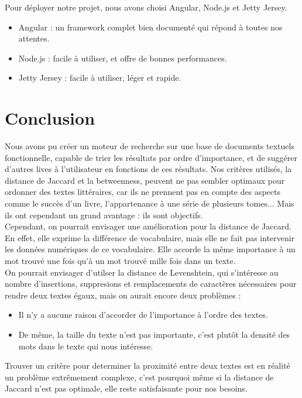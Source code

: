 \documentclass{article}
\begin{document}
Pour déployer notre projet, nous avons choisi Angular, Node.js et Jetty Jersey.\\

\begin{itemize}
\item Angular : un framework complet bien documenté qui répond à toutes nos attentes.
\item Node.js : facile à utiliser, et offre de bonnes performances.
\item Jetty Jersey : facile à utiliser, léger et rapide.\\
\end{itemize}

\section*{Conclusion}

Nous avons pu créer un moteur de recherche sur une base de documents textuels fonctionnelle, capable de trier les résultats par ordre d'importance, et de suggérer d'autres lives à l'utilisateur en fonctions de ces résultats. Nos critères utilisés, la distance de Jaccard et la betweenness, peuvent ne pas sembler optimaux pour ordonner des textes littéraires, car ils ne prennent pas en compte des aspects comme le succès d'un livre, l'appartenance à une série de plusieurs tomes... Mais ils ont cependant un grand avantage : ils sont objectifs.\\
Cependant, on pourrait envisager une amélioration pour la distance de Jaccard. En effet, elle exprime la différence de vocabulaire, mais elle ne fait pas intervenir les données numériques de ce vocabulaire. Elle accorde la même importance à un mot trouvé une fois qu'à un mot trouvé mille fois dans un texte.\\

On pourrait envisager d'utilser la distance de Levenshtein, qui s'intéresse au nombre d'insertions, suppresions et remplacements de caractères nécessaires pour rendre deux textes égaux, mais on aurait encore deux problèmes :\\

\begin{itemize}
\item Il n'y a aucune raison d'accorder de l'importance à l'ordre des textes.
\item De même, la taille du texte n'est pas importante, c'est plutôt la densité des mots dans le texte qui nous intéresse.\\
\end{itemize}

Trouver un critère pour determiner la proximité entre deux textes est en réalité un problème extrêmement complexe, c'est pourquoi même si la distance de Jaccard n'est pas optimale, elle reste satisfaisante pour nos besoins.


{}


\newpage

\tableofcontents
{}
\end{document}
